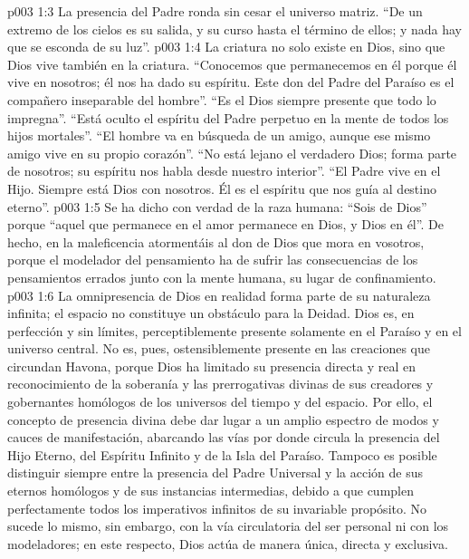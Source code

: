 \vs p003 1:3 La presencia del Padre ronda sin cesar el universo matriz. “De un extremo de los cielos es su salida, y su curso hasta el término de ellos; y nada hay que se esconda de su luz”.
\vs p003 1:4 \pc La criatura no solo existe en Dios, sino que Dios vive también en la criatura. “Conocemos que permanecemos en él porque él vive en nosotros; él nos ha dado su espíritu. Este don del Padre del Paraíso es el compañero inseparable del hombre”. “Es el Dios siempre presente que todo lo impregna”. “Está oculto el espíritu del Padre perpetuo en la mente de todos los hijos mortales”. “El hombre va en búsqueda de un amigo, aunque ese mismo amigo vive en su propio corazón”. “No está lejano el verdadero Dios; forma parte de nosotros; su espíritu nos habla desde nuestro interior”. “El Padre vive en el Hijo. Siempre está Dios con nosotros. Él es el espíritu que nos guía al destino eterno”.
\vs p003 1:5 Se ha dicho con verdad de la raza humana: “Sois de Dios” porque “aquel que permanece en el amor permanece en Dios, y Dios en él”. De hecho, en la maleficencia atormentáis al don de Dios que mora en vosotros, porque el modelador del pensamiento ha de sufrir las consecuencias de los pensamientos errados junto con la mente humana, su lugar de confinamiento.
\vs p003 1:6 \pc La omnipresencia de Dios en realidad forma parte de su naturaleza infinita; el espacio no constituye un obstáculo para la Deidad. Dios es, en perfección y sin límites, perceptiblemente presente solamente en el Paraíso y en el universo central. No es, pues, ostensiblemente presente en las creaciones que circundan Havona, porque Dios ha limitado su presencia directa y real en reconocimiento de la soberanía y las prerrogativas divinas de sus creadores y gobernantes homólogos de los universos del tiempo y del espacio. Por ello, el concepto de presencia divina debe dar lugar a un amplio espectro de modos y cauces de manifestación, abarcando las vías por donde circula la presencia del Hijo Eterno, del Espíritu Infinito y de la Isla del Paraíso. Tampoco es posible distinguir siempre entre la presencia del Padre Universal y la acción de sus eternos homólogos y de sus instancias intermedias, debido a que cumplen perfectamente todos los imperativos infinitos de su invariable propósito. No sucede lo mismo, sin embargo, con la vía circulatoria del ser personal ni con los modeladores; en este respecto, Dios actúa de manera única, directa y exclusiva.

